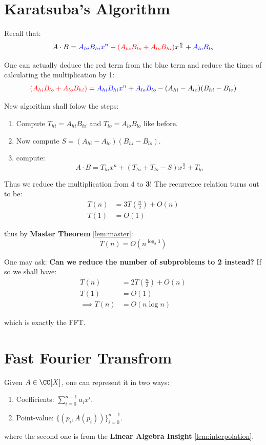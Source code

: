 \section{Karatsuba's Algorithm}

Recall that:
\[
  A\cdot B = \mathcolor{blue}{A_{hi}B_{hi}x^n} + \mathcolor{red}{(A_{hi}B_{lo} + A_{lo}B_{hi})}x^{\frac{n}{2}} + \mathcolor{blue}{A_{lo}B_{lo}}
\] 

One can actually deduce the red term from the blue term and reduce the times of calculating the multiplication by 1:
\[
  \mathcolor{red}{(A_{hi}B_{lo} + A_{lo}B_{hi})} = \mathcolor{blue}{A_{hi}B_{hi}x^n} + \mathcolor{blue}{A_{lo}B_{lo}} - (A_{hi} - A_{lo})(B_{hi} - B_{lo})
\] 

New algorithm shall folow the steps:
\begin{enumerate}
  \item Compute \( T_{hi} = A_{hi}B_{hi} \) and \( T_{lo} = A_{lo}B_{lo} \) like before.
  \item Now compute \( S = (A_{hi} - A_{lo})(B_{hi} - B_{lo}) \).
  \item compute:
    \[
      A\cdot B = T_{hi}x^n + (T_{hi}+T_{lo} - S)x^{\frac{n}{2}} + T_{lo} 
    \] 
\end{enumerate}

Thus we reduce the multiplication from \( 4 \) to \textbf{3}! The recurrence relation turns out to be:
\[
  \begin{aligned}
    T(n) &= 3T(\frac{n}{2}) + O(n) \\ 
    T(1) &= O(1)
  \end{aligned}
\] 

thus by \textbf{Master Theorem} \ref{lem:master}:
\[
  T(n) = O(n^{\log_2 3})
\] 

One may ask: \textbf{Can we reduce the number of subproblems to 2 instead?} If so we shall have:
\[
  \begin{aligned}
    T(n) &= 2T(\frac{n}{2}) + O(n) \\ 
    T(1) &= O(1) \\ 
    \implies T(n) &= O(n\log n)
  \end{aligned} 
\] 

which is exactly the FFT.

\section{Fast Fourier Transfrom}

\begin{definition}
  Given \( A \in \CC[X] \), one can represent it in two ways:
  \begin{enumerate}
    \item Coefficients: \( \sum_{i=0}^{n-1}a_ix^i \).
    \item Point-value: \( \{(p_i, A(p_i))\}_{i=0}^{n-1} \).
  \end{enumerate}

  where the second one is from the \textbf{Linear Algebra Insight} \ref{lem:interpolation}.
\end{definition}

